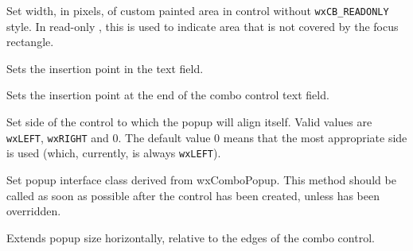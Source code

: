 
Set width, in pixels, of custom painted area in control without {\tt wxCB\_READONLY}
style. In read-only , this is used
to indicate area that is not covered by the focus rectangle.


\label{wxcomboctrlsetinsertionpoint}


Sets the insertion point in the text field.




\label{wxcomboctrlsetinsertionpointend}


Sets the insertion point at the end of the combo control text field.


\label{wxcomboctrlsetpopupanchor}


Set side of the control to which the popup will align itself. Valid values are
{\tt wxLEFT}, {\tt wxRIGHT} and $0$. The default value $0$ means that the most appropriate
side is used (which, currently, is always {\tt wxLEFT}).


\label{wxcomboctrlsetpopupcontrol}


Set popup interface class derived from wxComboPopup.
This method should be called as soon as possible after the control
has been created, unless 
has been overridden.


\label{wxcomboctrlsetpopupextents}


Extends popup size horizontally, relative to the edges of the combo control.



